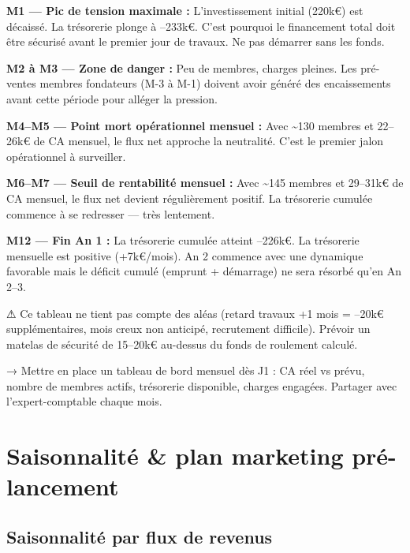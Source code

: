 \documentclass[11pt, a4paper]{article}
\newcommand{\eyebrow}[1]{%
  \vspace{4pt}{\small\color{fc-ink3}\texttt{— #1}}\vspace{2pt}
}
\begin{document}
\textbf{M1 — Pic de tension maximale :} L'investissement initial (220k€) est décaissé. La trésorerie plonge à –233k€. C'est pourquoi le financement total doit être sécurisé avant le premier jour de travaux. Ne pas démarrer sans les fonds.

\textbf{M2 à M3 — Zone de danger :} Peu de membres, charges pleines. Les pré-ventes membres fondateurs (M-3 à M-1) doivent avoir généré des encaissements avant cette période pour alléger la pression.

\textbf{M4–M5 — Point mort opérationnel mensuel :} Avec \textasciitilde130 membres et 22–26k€ de CA mensuel, le flux net approche la neutralité. C'est le premier jalon opérationnel à surveiller.

\textbf{M6–M7 — Seuil de rentabilité mensuel :} Avec \textasciitilde145 membres et 29–31k€ de CA mensuel, le flux net devient régulièrement positif. La trésorerie cumulée commence à se redresser — très lentement.

\textbf{M12 — Fin An 1 :} La trésorerie cumulée atteint –226k€. La trésorerie mensuelle est positive (+7k€/mois). An 2 commence avec une dynamique favorable mais le déficit cumulé (emprunt + démarrage) ne sera résorbé qu'en An 2–3.

\begin{warnbox}
⚠ Ce tableau ne tient pas compte des aléas (retard travaux +1 mois = –20k€ supplémentaires, mois creux non anticipé, recrutement difficile). Prévoir un matelas de sécurité de 15–20k€ au-dessus du fonds de roulement calculé.
\end{warnbox}

\begin{tipbox}
→ Mettre en place un tableau de bord mensuel dès J1 : CA réel vs prévu, nombre de membres actifs, trésorerie disponible, charges engagées. Partager avec l'expert-comptable chaque mois.
\end{tipbox}

\section{Saisonnalité \& plan marketing pré-lancement}
\eyebrow{F — SAISONNALITÉ \& MARKETING}

\subsection{Saisonnalité par flux de revenus}
\end{document}
